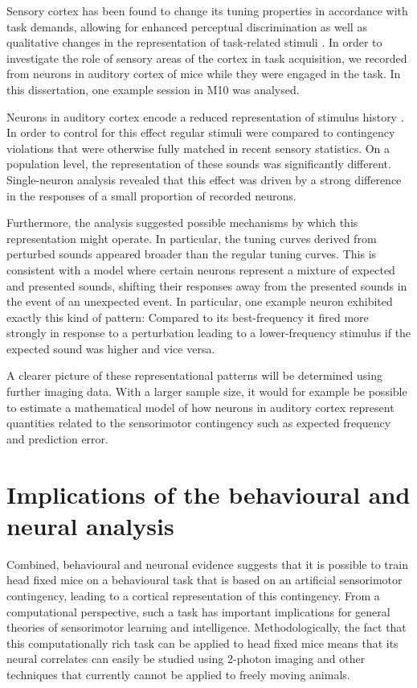 \documentclass[]{report}
\theoremstyle{definition}
\theoremstyle{definition}
\theoremstyle{definition}
\theoremstyle{remark}
\begin{document}
Sensory cortex has been found to change its tuning properties in
accordance with task demands, allowing for enhanced perceptual
discrimination as well as qualitative changes in the representation of
task-related stimuli
\citep{jeanne2013associative, peron2015whiskers, chu2016balancing}. In
order to investigate the role of sensory areas of the cortex in task
acquisition, we recorded from neurons in auditory cortex of mice while
they were engaged in the task. In this dissertation, one example session
in M10 was analysed.

Neurons in auditory cortex encode a reduced representation of stimulus
history \citep{rubin2016representation}. In order to control for this
effect regular stimuli were compared to contingency violations that were
otherwise fully matched in recent sensory statistics. On a population
level, the representation of these sounds was significantly different.
Single-neuron analysis revealed that this effect was driven by a strong
difference in the responses of a small proportion of recorded neurons.

Furthermore, the analysis suggested possible mechanisms by which this
representation might operate. In particular, the tuning curves derived
from perturbed sounds appeared broader than the regular tuning curves.
This is consistent with a model where certain neurons represent a
mixture of expected and presented sounds, shifting their responses away
from the presented sounds in the event of an unexpected event. In
particular, one example neuron exhibited exactly this kind of pattern:
Compared to its best-frequency it fired more strongly in response to a
perturbation leading to a lower-frequency stimulus if the expected sound
was higher and vice versa.

A clearer picture of these representational patterns will be determined
using further imaging data. With a larger sample size, it would for
example be possible to estimate a mathematical model of how neurons in
auditory cortex represent quantities related to the sensorimotor
contingency such as expected frequency and prediction error.

\hypertarget{implications-of-the-behavioural-and-neural-analysis}{%
\section{Implications of the behavioural and neural
analysis}\label{implications-of-the-behavioural-and-neural-analysis}}

Combined, behavioural and neuronal evidence suggests that it is possible
to train head fixed mice on a behavioural task that is based on an
artificial sensorimotor contingency, leading to a cortical
representation of this contingency. From a computational perspective,
such a task has important implications for general theories of
sensorimotor learning and intelligence. Methodologically, the fact that
this computationally rich task can be applied to head fixed mice means
that its neural correlates can easily be studied using 2-photon imaging
and other techniques that currently cannot be applied to freely moving
animals.
\end{document}
